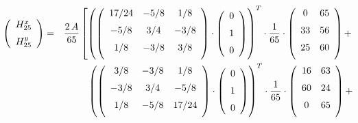 \documentclass[11pt]{article}
\begin{document}
\begin{eqnarray}
\hspace{-1cm}
\left(
\begin {array}{c}
H_{25}^x\\
\noalign{\medskip}
H_{25}^y\\
\end {array}
\right)
& = & %
\frac{2 \, A}{65} 
\left[
\left(
\left(
\begin {array}{ccc}
17/24&-5/8&1/8\\
\noalign{\medskip}
-5/8&3/4&-3/8\\
\noalign{\medskip}
1/8&-3/8&3/8\\
\noalign{\medskip}
\end {array}
\right)
\cdot 
\left(
\begin {array}{c}
0\\
\noalign{\medskip}
1\\
\noalign{\medskip}
0
\end {array}
\right)
\right)^T
\cdot
\frac{1}{65}
\cdot
\left(
\begin {array}{cc}
0&65\\
\noalign{\medskip}
33&56\\
\noalign{\medskip}
25&60\\
\noalign{\medskip}
\end {array}
\right)
+
\right. 
\nonumber
\\ && %
\left(
\left(
\begin {array}{ccc}
3/8&-3/8&1/8\\
\noalign{\medskip}
-3/8&3/4&-5/8\\
\noalign{\medskip}
1/8&-5/8&17/24\\
\noalign{\medskip}
\end {array}
\right)
\cdot 
\left(
\begin {array}{c}
0\\
\noalign{\medskip}
1\\
\noalign{\medskip}
0
\end {array}
\right)
\right)^T
\cdot
\frac{1}{65}
\cdot
\left(
\begin {array}{cc}
16&63\\
\noalign{\medskip}
60&24\\
\noalign{\medskip}
0&65\\
\noalign{\medskip}
\end {array}
\right)
+
\nonumber
\\&& %

\end{eqnarray}
\end{document}
